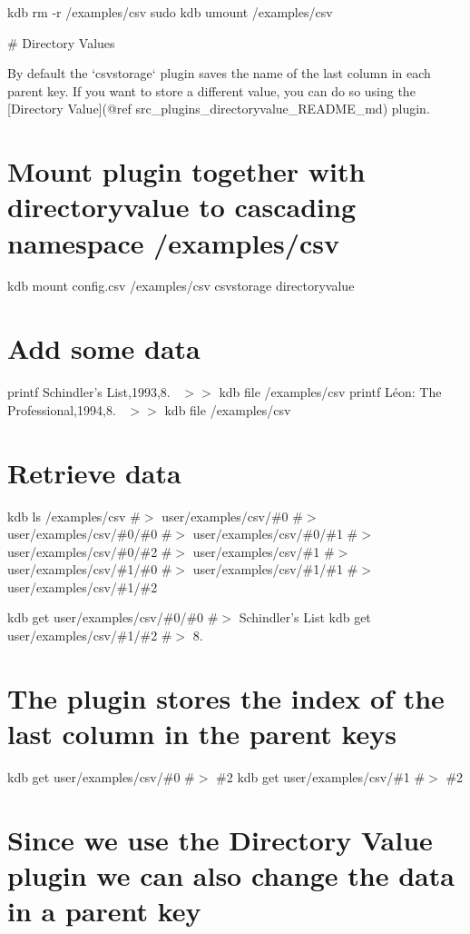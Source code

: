 kdb rm -\/r /examples/csv sudo kdb umount /examples/csv 
\begin{DoxyCode}
# Directory Values

By default the `csvstorage` plugin saves the name of the last column in each parent key. If you want to
       store a different value, you can do
so using the [Directory Value](@ref src\_plugins\_directoryvalue\_README\_md) plugin.
\end{DoxyCode}
 \section*{Mount plugin together with {\ttfamily directoryvalue} to cascading namespace {\ttfamily /examples/csv}}

kdb mount config.\+csv /examples/csv csvstorage directoryvalue

\section*{Add some data}

printf \textquotesingle{}Schindler’s List,1993,8.~\newline
\textquotesingle{} $>$$>$ {\ttfamily kdb file /examples/csv} printf \textquotesingle{}Léon\+: The Professional,1994,8.~\newline
\textquotesingle{} $>$$>$ {\ttfamily kdb file /examples/csv}

\section*{Retrieve data}

kdb ls /examples/csv \#$>$ user/examples/csv/\#0 \#$>$ user/examples/csv/\#0/\#0 \#$>$ user/examples/csv/\#0/\#1 \#$>$ user/examples/csv/\#0/\#2 \#$>$ user/examples/csv/\#1 \#$>$ user/examples/csv/\#1/\#0 \#$>$ user/examples/csv/\#1/\#1 \#$>$ user/examples/csv/\#1/\#2

kdb get user/examples/csv/\#0/\#0 \#$>$ Schindler’s List kdb get user/examples/csv/\#1/\#2 \#$>$ 8.

\section*{The plugin stores the index of the last column in the parent keys}

kdb get user/examples/csv/\#0 \#$>$ \#2 kdb get user/examples/csv/\#1 \#$>$ \#2

\section*{Since we use the Directory Value plugin we can also change the data in a parent key}

